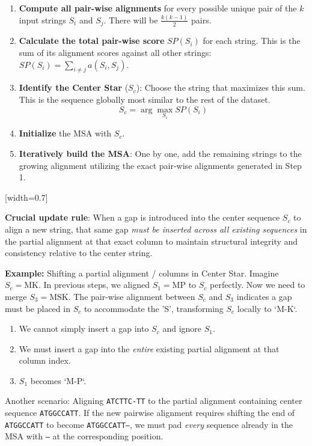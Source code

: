 \begin{enumerate}
    \item \textbf{Compute all pair-wise alignments} for every possible unique pair of the $k$ input strings $S_i$ and $S_j$. There will be $\frac{k(k-1)}{2}$ pairs.
    \item \textbf{Calculate the total pair-wise score} $SP(S_i)$ for each string. This is the sum of its alignment scores against all other strings: $SP(S_i) = \sum_{i \neq j} a(S_i, S_j)$.
    \item \textbf{Identify the Center Star} ($S_c$): Choose the string that maximizes this sum. This is the sequence globally most similar to the rest of the dataset.
    \[ S_c = \arg \max_{S_i} SP(S_i) \]
    \item \textbf{Initialize} the MSA with $S_c$.
    \item \textbf{Iteratively build the MSA}: One by one, add the remaining strings to the growing alignment utilizing the exact pair-wise alignments generated in Step 1.
\end{enumerate}

[width=0.7\textwidth]

\sta \textbf{Crucial update rule}: When a gap is introduced into the center sequence $S_c$ to align a new string, that same gap \textit{must be inserted across all existing sequences} in the partial alignment at that exact column to maintain structural integrity and consistency relative to the center string.

\textbf{Example:} Shifting a partial alignment / columns in Center Star.
Imagine $S_c = \text{MK}$. In previous steps, we aligned $S_1 = \text{MP}$ to $S_c$ perfectly. Now we need to merge $S_3 = \text{MSK}$. The pair-wise alignment between $S_c$ and $S_3$ indicates a gap must be placed in $S_c$ to accommodate the 'S', transforming $S_c$ locally to `M-K`.
\begin{enumerate}
    \item We cannot simply insert a gap into $S_c$ and ignore $S_1$.
    \item We must insert a gap into the \textit{entire} existing partial alignment at that column index.
    \item $S_1$ becomes `M-P`. 
\end{enumerate}
Another scenario: Aligning \texttt{ATCTTC-TT} to the partial alignment containing center sequence \texttt{ATGGCCATT}. 
If the new pairwise alignment requires shifting the end of \texttt{ATGGCCATT} to become \texttt{ATGGCCATT--}, we must pad \textit{every} sequence already in the MSA with \texttt{--} at the corresponding position.

